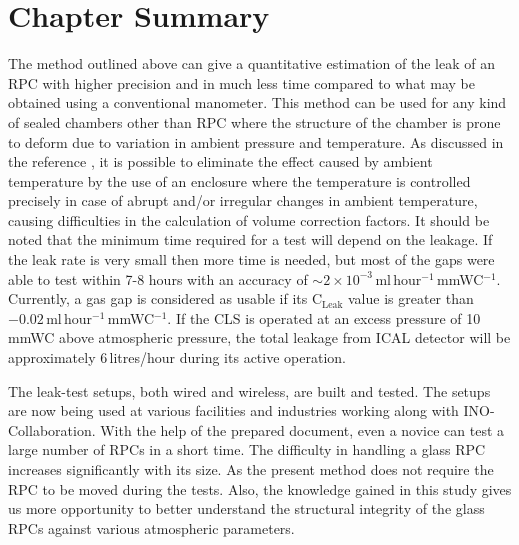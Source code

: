 \section{Chapter Summary}
The method outlined above can give a quantitative estimation of the
leak of an RPC with higher precision and in much less time compared to
what may be obtained using a conventional manometer. This method can
be used for any kind of sealed chambers other than RPC where the
structure of the chamber is prone to deform due to variation in
ambient pressure and temperature. As discussed in the reference
\cite{rpcleak2016}, it is possible to eliminate the effect caused by
ambient temperature by the use of an enclosure where the temperature
is controlled precisely in case of abrupt and/or irregular changes in
ambient temperature, causing difficulties in the calculation of volume
correction factors. It should be noted that the minimum time required
for a test will depend on the leakage. If the leak rate is very small
then more time is needed, but most of the gaps were able to test
within 7-8 hours with an accuracy of
$\sim 2\times 10^{-3}$\,ml\,hour$^{-1}$\,mmWC$^{-1}$. Currently, a gas
gap is considered as usable if its $\textrm{C}_{\textrm{Leak}}$ value is
greater than $-0.02$\,ml\,hour$^{-1}$\,mmWC$^{-1}$. If the CLS is
operated at an excess pressure of 10\,mmWC above atmospheric pressure,
the total leakage from ICAL detector will be approximately
6\,litres/hour during its active operation.

The leak-test setups, both wired and wireless, are built and tested.
The setups are now being used at various facilities and industries
working along with INO-Collaboration. With the help of the prepared
document, even a novice can test a large number of RPCs in a short
time. The difficulty in handling a glass RPC increases significantly
with its size. As the present method does not require the RPC to be
moved during the tests. Also, the
knowledge gained in this study gives us more opportunity to better
understand the structural integrity of the glass RPCs against various
atmospheric parameters.

